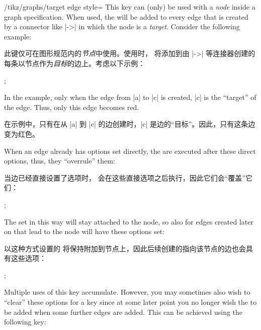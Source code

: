\begin{key}{/tikz/graphs/target edge style=}
    This key can (only) be used with a \emph{node} inside a graph
    specification. When used, the  will be added to every edge
    that is created by a connector like |->| in which the node is a
    \emph{target}. Consider the following example:
    
    此键仅可在图形规范内的\emph{节点}中使用。使用时， 将添加到由 |->| 等连接器创建的每条以节点作为\emph{目标}的边上。考虑以下示例：
\begin{codeexample}[preamble={\usetikzlibrary{graphs}}]
\tikz {};
\end{codeexample}
    In the example, only when the edge from |a| to |c| is created, |c| is the
    ``target'' of the edge. Thus, only this edge becomes red.

    在示例中，只有在从 |a| 到 |c| 的边创建时，|c| 是边的``目标''。因此，只有这条边变为红色。

    When an edge already has options set directly, the  are
    executed after these direct options, thus, they ``overrule'' them:
    
    当边已经直接设置了选项时， 会在这些直接选项之后执行，因此它们会``覆盖''它们：

\begin{codeexample}[preamble={\usetikzlibrary{graphs}}]
\tikz {};
\end{codeexample}

    The  set in this way will stay attached to the node, so also
    for edges created later on that lead to the node will have these options
    set:
    
    以这种方式设置的  将保持附加到节点上，因此后续创建的指向该节点的边也会具有这些选项：
\begin{codeexample}[preamble={\usetikzlibrary{graphs}}]
\tikz {};
\end{codeexample}

    Multiple uses of this key accumulate. However, you may sometimes also wish
    to ``clear'' these options for a key since at some later point you no
    longer wish the  to be added when some further edges are
    added. This can be achieved using the following key:
    

\end{key}
